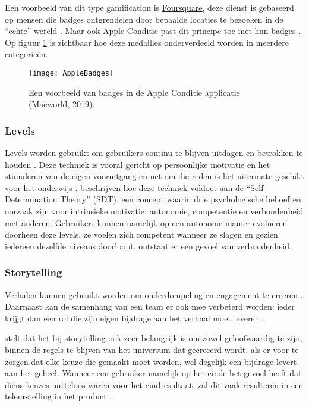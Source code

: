 Een voorbeeld van dit type gamification is \href{https://foursquare.com/}{Foursquare}, deze dienst is gebaseerd op mensen die badges ontgrendelen door bepaalde locaties te bezoeken in de ``echte'' wereld \autocite{Hamari2011}. Maar ook Apple Conditie past dit principe toe met hun badges \autocite{Ha2020}. Op figuur \ref{fig:apple_badges} is zichtbaar hoe deze medailles onderverdeeld worden in meerdere categorieën.

\begin{figure}[h]
    \caption[Badges in de Apple Conditie applicatie]{Een voorbeeld van badges in de Apple Conditie applicatie (Macworld, \href{https://www.macworld.com/article/231140/how-to-get-all-of-the-apple-watch-activity-challenge-badges.html}{2019}).}
    \texttt{[image: AppleBadges]}
    \label{fig:apple_badges}
\end{figure}

\subsubsection{Levels}
Levels worden gebruikt om gebruikers continu te blijven uitdagen en betrokken te houden \autocite{Dong2012}. Deze techniek is vooral gericht op persoonlijke motivatie en het stimuleren van de eigen vooruitgang en net om die reden is het uitermate geschikt voor het onderwijs \autocite{ManzanoLeon2021}.
\textcite{ManzanoLeon2021} beschrijven hoe deze techniek voldoet aan de ``Self-Determination Theory'' (SDT), een concept waarin drie psychologische behoeften oorzaak zijn voor intrinsieke motivatie: autonomie, competentie en verbondenheid met anderen. Gebruikers kunnen namelijk op een autonome manier evolueren doorheen deze levels, ze voelen zich competent wanneer ze slagen en gezien iedereen dezelfde niveaus doorloopt, ontstaat er een gevoel van verbondenheid.

\subsubsection{Storytelling}
Verhalen kunnen gebruikt worden om onderdompeling en engagement te creëren \autocite{ManzanoLeon2021}. Daarnaast kan de samenhang van een team er ook mee verbeterd worden: ieder krijgt dan een rol die zijn eigen bijdrage aan het verhaal moet leveren \autocite{ManzanoLeon2021}.

\textcite{Marczewski2015} stelt dat het bij storytelling ook zeer belangrijk is om zowel geloofwaardig te zijn, binnen de regels te blijven van het universum dat gecreëerd wordt, als er voor te zorgen dat elke keuze die gemaakt moet worden, wel degelijk een bijdrage levert aan het geheel. Wanneer een gebruiker namelijk op het einde het gevoel heeft dat diens keuzes nutteloos waren voor het eindresultaat, zal dit vaak resulteren in een teleurstelling in het product \autocite{Marczewski2015}.

